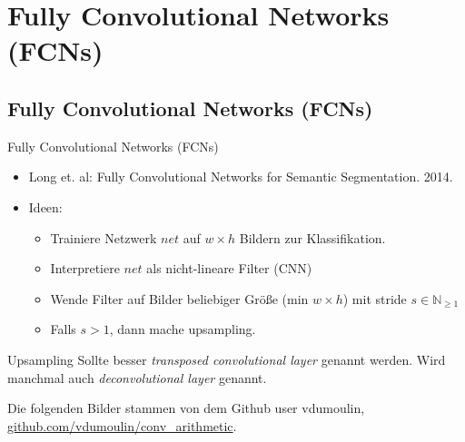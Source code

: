 
\section{Fully Convolutional Networks (FCNs)}
\subsection{Fully Convolutional Networks (FCNs)}

\begin{frame}{Fully Convolutional Networks (FCNs)}
    \begin{itemize}
        \item Long et. al: Fully Convolutional Networks for Semantic Segmentation. 2014.
        \item Ideen:
        \begin{itemize}
            \item Trainiere Netzwerk $net$ auf $w \times h$ Bildern zur
                  Klassifikation.
            \item Interpretiere $net$ als nicht-lineare Filter (CNN)
            \item Wende Filter auf Bilder beliebiger Größe (min $w \times h$)
                  mit stride $s \in \mathbb{N}_{\geq 1}$
            \item Falls $s > 1$, dann mache upsampling.
        \end{itemize}
    \end{itemize}
\end{frame}



\begin{frame}{Upsampling}
    Sollte besser \textit{transposed convolutional layer} genannt werden. Wird
    manchmal auch \textit{deconvolutional layer} genannt.

    Die folgenden Bilder stammen von dem Github user vdumoulin, \href{https://github.com/vdumoulin/conv_arithmetic}{github.com/vdumoulin/conv\_arithmetic}.
\end{frame}

